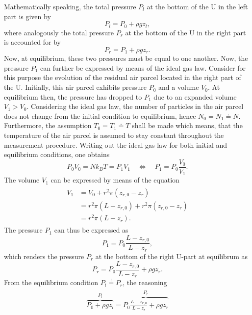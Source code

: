 \documentclass[a4paper,10pt, twocolumn]{article}
\begin{document}
Mathematically speaking, the total pressure $P_l$ at the bottom of the U in the left part is given by \begin{equation}
	P_l = P_0 + \rho g z_l,
\end{equation} where analogously the total pressure $P_r$ at the bottom of the U in the right part is accounted for by \begin{equation}
P_r = P_1 + \rho g z_r.
\end{equation}
Now, at equilibrium, these two pressures must be equal to one another. Now, the pressure $P_1$ can further be expressed by means of the ideal gas law. Consider for this purpose the evolution of the residual air parcel located in the right part of the U. Initially, this air parcel exhibits pressure $P_0$ and a volume $V_0$. At equilibrium then, the pressure has dropped to $P_1$ due to an expanded volume $V_1 > V_0$. Considering the ideal gas law, the number of particles in the air parcel does not change from the initial condition to equilibrium, hence $N_0 = N_1 \doteq N$. Furthermore, the assumption $T_0 = T_1 \doteq T$ shall be made which means, that the temperature of the air parcel is assumed to stay constant throughout the measurement procedure. Writing out the ideal gas law for both initial and equilibrium conditions, one obtains \begin{equation}
	P_0V_0 = Nk_BT = P_1V_1 \quad \Leftrightarrow \quad P_1 = P_0\frac{V_0}{V_1}.
\end{equation} The volume $V_1$ can be expressed by means of the equation \begin{align}\begin{aligned}
V_1 &= V_0 + r^2\pi(z_{r,0}-z_r) \\ &= r^2\pi(L-z_{r,0})+r^2\pi(z_{r,0}-z_r) \\
&= r^2\pi (L-z_r).
\end{aligned}\end{align} The pressure $P_1$ can thus be expressed as \begin{equation}
P_1 = P_0 \frac{L-z_{r,0}}{L-z_{r}},
\end{equation} which renders the pressure $P_r$ at the bottom of the right U-part at equilibrum as \begin{equation}
P_r = P_0 \frac{L-z_{r,0}}{L-z_{r}} + \rho gz_r.
\end{equation} From the equilibrium condition $P_l \overset{!}{=} P_r$, the reasoning \begin{gather}
\begin{gathered}
	\overbrace{P_0 + \rho g z_l}^{P_l} = \overbrace{P_0 \frac{L-z_{r,0}}{L-z_{r}} + \rho gz_r}^{P_r} \\

\end{gathered}
\end{gather}
\end{document}
